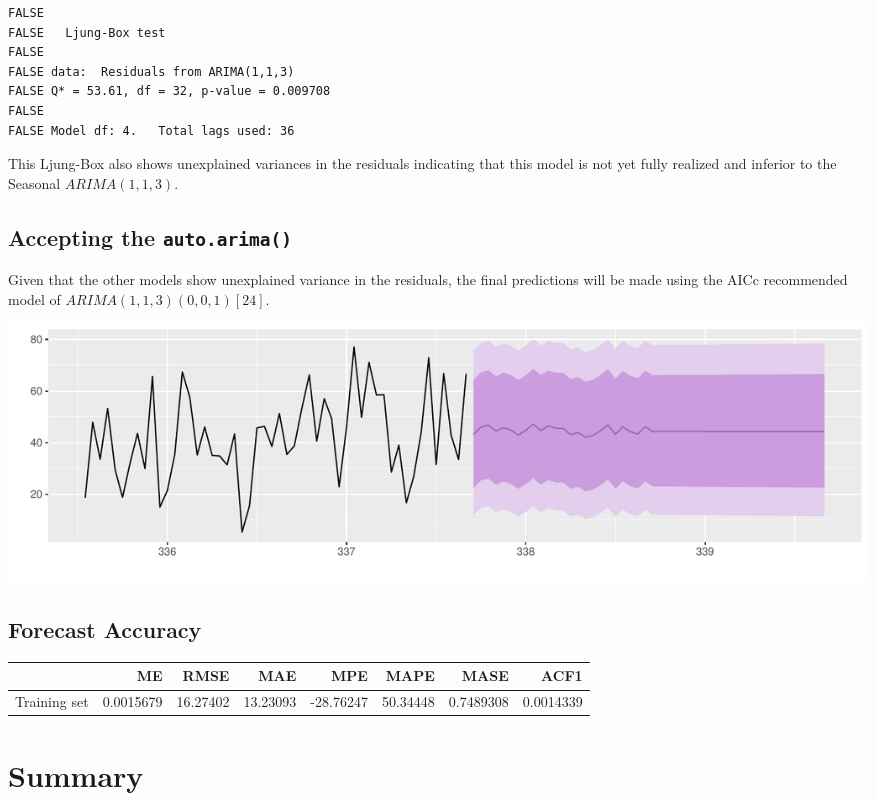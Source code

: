 \documentclass[openany]{book}
\begin{document}
\begin{verbatim}
FALSE 
FALSE   Ljung-Box test
FALSE 
FALSE data:  Residuals from ARIMA(1,1,3)
FALSE Q* = 53.61, df = 32, p-value = 0.009708
FALSE 
FALSE Model df: 4.   Total lags used: 36
\end{verbatim}

This Ljung-Box also shows unexplained variances in the residuals
indicating that this model is not yet fully realized and inferior to the
Seasonal \(ARIMA (1,1,3)\).

\hypertarget{accepting-the-auto.arima}{%
\subsection{\texorpdfstring{Accepting the
\texttt{auto.arima()}}{Accepting the auto.arima()}}\label{accepting-the-auto.arima}}

Given that the other models show unexplained variance in the residuals,
the final predictions will be made using the AICc recommended model of
\(ARIMA (1,1,3)(0,0,1)[24]\).

\includegraphics{Group2_Project1_Fall2019_files/figure-latex/unnamed-chunk-27-1.pdf}

\hypertarget{forecast-accuracy}{%
\subsection{Forecast Accuracy}\label{forecast-accuracy}}

\begin{tabular}{l|r|r|r|r|r|r|r}
\hline
  & ME & RMSE & MAE & MPE & MAPE & MASE & ACF1\\
\hline
Training set & 0.0015679 & 16.27402 & 13.23093 & -28.76247 & 50.34448 & 0.7489308 & 0.0014339\\
\hline
\end{tabular}

\hypertarget{summary-2}{%
\section{Summary}\label{summary-2}}
\end{document}
